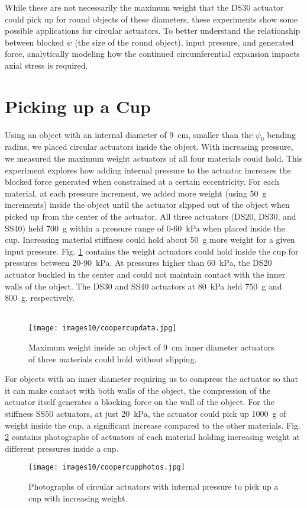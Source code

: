 While these are not necessarily the maximum weight that the DS30 actuator could pick up for round objects of these diameters, these experiments show some possible applications for circular actuators. To better understand the relationship between blocked $\psi$ (the size of the round object), input pressure, and generated force, analytically modeling how the continued circumferential expansion impacts axial stress is required. 

\section{Picking up a Cup}

Using an object with an internal diameter of 9~cm, smaller than the $\psi_0$ bending radius, we placed circular actuators inside the object. With increasing pressure, we measured the maximum weight actuators of all four materials could hold. This experiment explores how adding internal pressure to the actuator increases the blocked force generated when constrained at a certain eccentricity. For each material, at each pressure increment, we added more weight (using 50~g increments) inside the object until the actuator slipped out of the object when picked up from the center of the actuator. All three actuators (DS20, DS30, and SS40) held 700~g within a pressure range of 0-60~kPa when placed inside the cup. Increasing material stiffness could hold about 50~g more weight for a given input pressure. Fig. \ref{fig:coopercupdata} contains the weight actuators could hold inside the cup for pressures between 20-90~kPa. At pressures higher than 60~kPa, the DS20 actuator buckled in the center and could not maintain contact with the inner walls of the object. The DS30 and SS40 actuators at 80~kPa held 750~g and 800~g, respectively. 
\\
\\
\begin{figure}[!ht]
    \centering
     \texttt{[image: images10/coopercupdata.jpg]}
    \caption{Maximum weight inside an object of 9~cm inner diameter actuators of three materials could hold without slipping.}
    \label{fig:coopercupdata}
\end{figure}

For objects with an inner diameter requiring us to compress the actuator so that it can make contact with both walls of the object, the compression of the actuator itself generates a blocking force on the wall of the object. For the stiffness SS50 actuators, at just 20~kPa, the actuator could pick up 1000~g of weight inside the cup, a significant increase compared to the other materials. Fig. \ref{fig:coopercupphotos} contains photographs of actuators of each material holding increasing weight at different pressures inside a cup. 
\\
\begin{figure}[!ht]
    \centering
     \texttt{[image: images10/coopercupphotos.jpg]}
    \caption{Photographs of circular actuators with internal pressure to pick up a cup with increasing weight.}
    \label{fig:coopercupphotos}
\end{figure}

